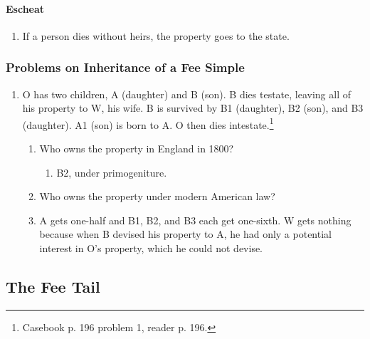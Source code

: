 \paragraph{Escheat}

\begin{enumerate}
    \item If a person dies without heirs, the property goes to the state.
\end{enumerate}

\subsubsection{Problems on Inheritance of a Fee Simple}

\begin{enumerate}
    \item O has two children, A (daughter) and B (son). B dies testate, 
    leaving all of his property to W, his wife. B is survived by B1 
    (daughter), B2 (son), and B3 (daughter). A1 (son) is born to A. O then 
    dies intestate.\footnote{Casebook p. 196 problem 1, reader p. 196.}
    \begin{enumerate}
        \item Who owns the property in England in 1800?
        \begin{enumerate}
            \item B2, under primogeniture.
        \end{enumerate}
        \item Who owns the property under modern American law?
        \item A gets one-half and B1, B2, and B3 each get one-sixth. W gets 
        nothing because when B devised his property to A, he had only a 
        potential interest in O's property, which he could not devise.
    \end{enumerate}
\end{enumerate}

\subsection{The Fee Tail}

